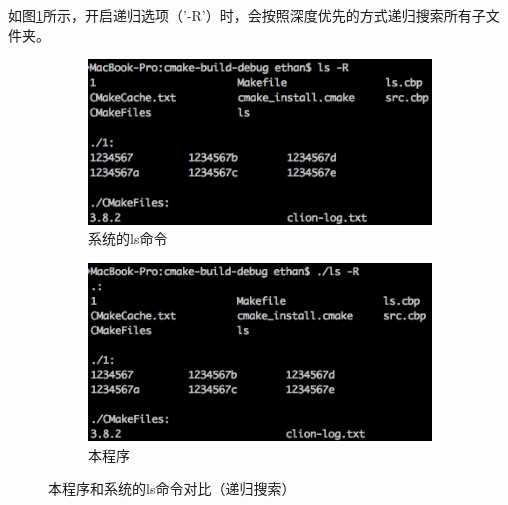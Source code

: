 \documentclass[UTF8,zihao=5,AutoFakeBold]{ctexart}
\begin{document}
如图\ref{fig:myls_and_ls_R}所示，开启递归选项（'-R'）时，会按照深度优先的方式递归搜索所有子文件夹。
\begin{figure}[h!]
    \centering
    \begin{subfigure}[b]{0.4\linewidth}
        \includegraphics[width=\linewidth]{ls-R}
        \caption{系统的ls命令}
      \end{subfigure}
      \begin{subfigure}[b]{0.4\linewidth}
        \includegraphics[width=\linewidth]{myls-R}
        \caption{本程序}
      \end{subfigure}
    \caption{本程序和系统的ls命令对比（递归搜索）}
    \label{fig:myls_and_ls_R}
\end{figure}
\end{document}
